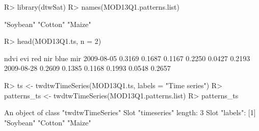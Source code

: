 \documentclass[article,shortnames]{jss}
\begin{document}
\begin{CodeChunk}

\begin{CodeInput}
R> library(dtwSat)
R> names(MOD13Q1.patterns.list)
\end{CodeInput}

\begin{CodeOutput}
[1] "Soybean" "Cotton"  "Maize"  
\end{CodeOutput}

\begin{CodeInput}
R> head(MOD13Q1.ts, n = 2)
\end{CodeInput}

\begin{CodeOutput}
             ndvi    evi    red    nir   blue    mir
2009-08-05 0.3169 0.1687 0.1167 0.2250 0.0427 0.2193
2009-08-28 0.2609 0.1385 0.1168 0.1993 0.0548 0.2657
\end{CodeOutput}
\end{CodeChunk}

\begin{CodeChunk}

\begin{CodeInput}
R> ts <- twdtwTimeSeries(MOD13Q1.ts, labels = "Time series")
R> patterns_ts <- twdtwTimeSeries(MOD13Q1.patterns.list)
R> patterns_ts
\end{CodeInput}

\begin{CodeOutput}
An object of class "twdtwTimeSeries"
Slot "timeseries" length: 3 
Slot "labels": [1] "Soybean" "Cotton"  "Maize"  
\end{CodeOutput}
\end{CodeChunk}
\end{document}
